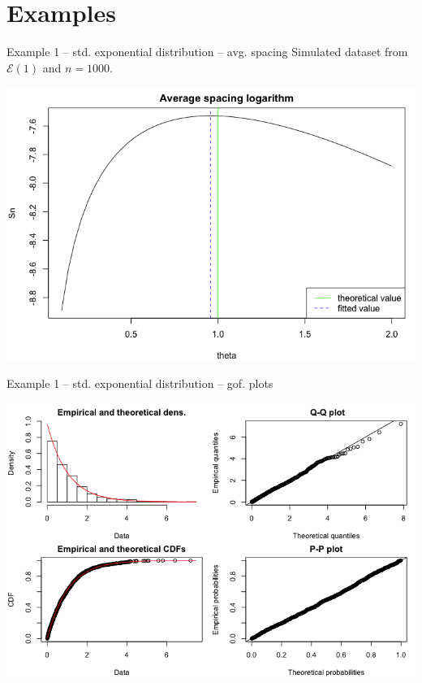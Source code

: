 \documentclass[8pt, hide notes]{beamer}
\begin{document}
\section{Examples}

\begin{frame}{Example 1 -- std. exponential distribution -- avg. spacing}
Simulated dataset from $\mathcal E(1)$ and $n=1000$.

\vfill
\centering

\includegraphics[width=1\textwidth]{img/exp-ASL}



\end{frame}

\begin{frame}{Example 1 -- std. exponential distribution -- gof. plots}


\centering

\includegraphics[width=\textwidth]{img/exp-plotdist}


\end{frame}
\end{document}
